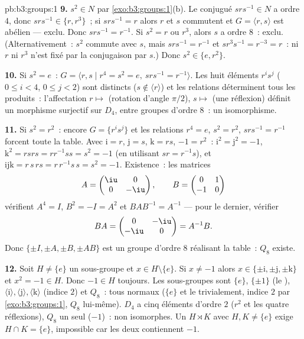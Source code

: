 \begin{solution}{pb:b3:groups:1}
\textbf{9.} $s^2 \in N$ par \cref{exo:b3:groups:1}(b). Le
conjugué $srs^{-1} \in N$ a ordre $4$, donc $srs^{-1} \in \{r,
r^3\}$~; si $srs^{-1} = r$ alors $r$ et $s$ commutent et $G =
\langle r, s\rangle$ est abélien --- exclu. Donc $srs^{-1} =
r^{-1}$. Si $s^2 = r$ ou $r^3$, alors $s$ a ordre $8$~: exclu.
(Alternativement~: $s^2$ commute avec $s$, mais $s r s^{-1} =
r^{-1}$ et $s r^3 s^{-1} = r^{-3} = r$~: ni $r$ ni $r^3$ n'est
fixé par la conjugaison par $s$.) Donc $s^2 \in \{e, r^2\}$.

\textbf{10.} Si $s^2 = e$~: $G = \langle r, s \mid r^4 = s^2 =
e,\ srs^{-1} = r^{-1}\rangle$. Les huit éléments $r^is^j$ ($0
\leq i < 4$, $0 \leq j < 2$) sont distincts ($s \notin \langle
r\rangle$) et les relations déterminent tous les produits~:
l'affectation $r \mapsto$ (rotation d'angle $\pi/2$), $s
\mapsto$ (une réflexion) définit un morphisme surjectif sur
$D_4$, entre groupes d'ordre $8$~: un isomorphisme.

\textbf{11.} Si $s^2 = r^2$~: encore $G = \{r^i s^j\}$ et les
relations $r^4 = e$, $s^2 = r^2$, $srs^{-1} = r^{-1}$ forcent
toute la table. Avec $\mathrm i = r$, $\mathrm j = s$, $\mathrm
k = rs$, $-1 = r^2$~: $\mathrm i^2 = \mathrm j^2 = -1$,
$\mathrm k^2 = rsrs = r r^{-1} s s = s^2 = -1$ (en utilisant $sr
= r^{-1}s$), et $\mathrm i \mathrm j \mathrm k = r\,s\,rs =
r\,r^{-1}s\,s = s^2 = -1$. Existence~: les matrices
\[
A = \begin{pmatrix} \iu & 0\\ 0 & -\iu \end{pmatrix},
\qquad
B = \begin{pmatrix} 0 & 1\\ -1 & 0 \end{pmatrix}
\]
vérifient $A^4 = I$, $B^2 = -I = A^2$ et $BAB^{-1} = A^{-1}$ ---
pour le dernier, vérifier
\[
BA = \begin{pmatrix} 0 & -\iu\\ -\iu & 0 \end{pmatrix} = A^{-1}B .
\]
Donc $\{\pm I, \pm A, \pm B, \pm AB\}$ est un groupe d'ordre $8$
réalisant la table~: $Q_8$ existe.

\textbf{12.} Soit $H \neq \{e\}$ un sous-groupe et $x \in H
\setminus \{e\}$. Si $x \neq -1$ alors $x \in \{\pm\mathrm i,
\pm\mathrm j, \pm\mathrm k\}$ et $x^2 = -1 \in H$. Donc $-1 \in
H$ toujours. Les sous-groupes sont $\{e\}$, $\{\pm 1\}$ (le
), $\langle \mathrm i\rangle, \langle \mathrm j\rangle,
\langle \mathrm k\rangle$ (indice $2$) et $Q_8$~: tous normaux
($\{e\}$ et le  trivialement, indice $2$ par
\cref{exo:b3:groups:1}, $Q_8$ lui-même). $D_4$ a cinq éléments
d'ordre $2$ ($r^2$ et les quatre réflexions), $Q_8$ un seul
($-1$)~: non isomorphes. Un  $H \rtimes K$
avec $H, K \neq \{e\}$ exige $H \cap K = \{e\}$, impossible car
les deux contiennent $-1$.


\end{solution}
